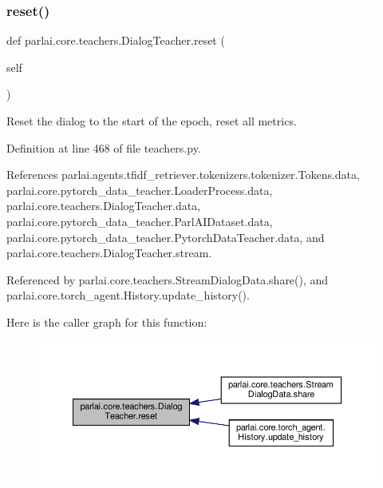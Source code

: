 \subsubsection{\texorpdfstring{reset()}{reset()}}
{\footnotesize\ttfamily def parlai.\+core.\+teachers.\+Dialog\+Teacher.\+reset (\begin{DoxyParamCaption}\item[{}]{self }\end{DoxyParamCaption})}

\begin{DoxyVerb}Reset the dialog to the start of the epoch, reset all metrics.\end{DoxyVerb}
 

Definition at line 468 of file teachers.\+py.



References parlai.\+agents.\+tfidf\+\_\+retriever.\+tokenizers.\+tokenizer.\+Tokens.\+data, parlai.\+core.\+pytorch\+\_\+data\+\_\+teacher.\+Loader\+Process.\+data, parlai.\+core.\+teachers.\+Dialog\+Teacher.\+data, parlai.\+core.\+pytorch\+\_\+data\+\_\+teacher.\+Parl\+A\+I\+Dataset.\+data, parlai.\+core.\+pytorch\+\_\+data\+\_\+teacher.\+Pytorch\+Data\+Teacher.\+data, and parlai.\+core.\+teachers.\+Dialog\+Teacher.\+stream.



Referenced by parlai.\+core.\+teachers.\+Stream\+Dialog\+Data.\+share(), and parlai.\+core.\+torch\+\_\+agent.\+History.\+update\+\_\+history().

Here is the caller graph for this function\+:
\nopagebreak
\begin{figure}[H]
\begin{center}
\leavevmode
\includegraphics[width=350pt]{classparlai_1_1core_1_1teachers_1_1DialogTeacher_a393f94ea28e1733f575a9f36a0b43c18_icgraph}
\end{center}
\end{figure}
\mbox{\label{classparlai_1_1core_1_1teachers_1_1DialogTeacher_a55fc9dead757489e127ec1a872849376}} 
